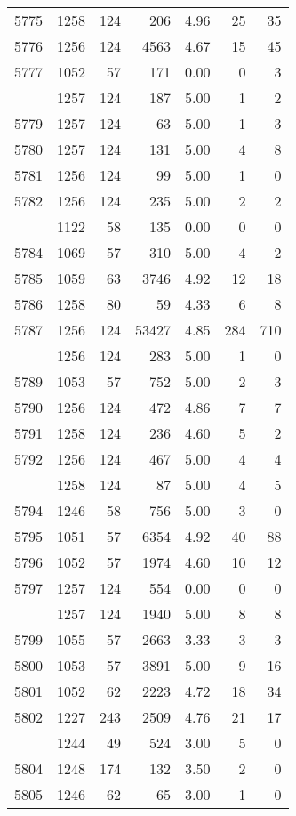 \documentclass[
]{article}
\begin{document}
\begin{table}
\begin{tabular}[t]{lrrrrrr}
5775 & 1258 & 124 & 206 & 4.96 & 25 & 35\\
5776 & 1256 & 124 & 4563 & 4.67 & 15 & 45\\
5777 & 1052 & 57 & 171 & 0.00 & 0 & 3\\
\addlinespace
5778 & 1257 & 124 & 187 & 5.00 & 1 & 2\\
5779 & 1257 & 124 & 63 & 5.00 & 1 & 3\\
5780 & 1257 & 124 & 131 & 5.00 & 4 & 8\\
5781 & 1256 & 124 & 99 & 5.00 & 1 & 0\\
5782 & 1256 & 124 & 235 & 5.00 & 2 & 2\\
\addlinespace
5783 & 1122 & 58 & 135 & 0.00 & 0 & 0\\
5784 & 1069 & 57 & 310 & 5.00 & 4 & 2\\
5785 & 1059 & 63 & 3746 & 4.92 & 12 & 18\\
5786 & 1258 & 80 & 59 & 4.33 & 6 & 8\\
5787 & 1256 & 124 & 53427 & 4.85 & 284 & 710\\
\addlinespace
5788 & 1256 & 124 & 283 & 5.00 & 1 & 0\\
5789 & 1053 & 57 & 752 & 5.00 & 2 & 3\\
5790 & 1256 & 124 & 472 & 4.86 & 7 & 7\\
5791 & 1258 & 124 & 236 & 4.60 & 5 & 2\\
5792 & 1256 & 124 & 467 & 5.00 & 4 & 4\\
\addlinespace
5793 & 1258 & 124 & 87 & 5.00 & 4 & 5\\
5794 & 1246 & 58 & 756 & 5.00 & 3 & 0\\
5795 & 1051 & 57 & 6354 & 4.92 & 40 & 88\\
5796 & 1052 & 57 & 1974 & 4.60 & 10 & 12\\
5797 & 1257 & 124 & 554 & 0.00 & 0 & 0\\
\addlinespace
5798 & 1257 & 124 & 1940 & 5.00 & 8 & 8\\
5799 & 1055 & 57 & 2663 & 3.33 & 3 & 3\\
5800 & 1053 & 57 & 3891 & 5.00 & 9 & 16\\
5801 & 1052 & 62 & 2223 & 4.72 & 18 & 34\\
5802 & 1227 & 243 & 2509 & 4.76 & 21 & 17\\
\addlinespace
5803 & 1244 & 49 & 524 & 3.00 & 5 & 0\\
5804 & 1248 & 174 & 132 & 3.50 & 2 & 0\\
5805 & 1246 & 62 & 65 & 3.00 & 1 & 0\\

\end{tabular}
\end{table}
\end{document}
